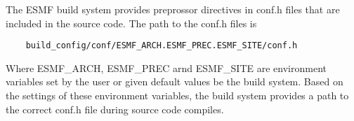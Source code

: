 The ESMF build system provides preprossor directives in conf.h files
that are included in the source code.  The path to the conf.h files is

\begin{verbatim}
    build_config/conf/ESMF_ARCH.ESMF_PREC.ESMF_SITE/conf.h
\end{verbatim}

Where ESMF\_ARCH, ESMF\_PREC arnd ESMF\_SITE are environment variables 
set by the user or given default values be the build system.  Based on 
the settings of these environment variables, the build system provides
a path to the correct conf.h file during source code compiles.

